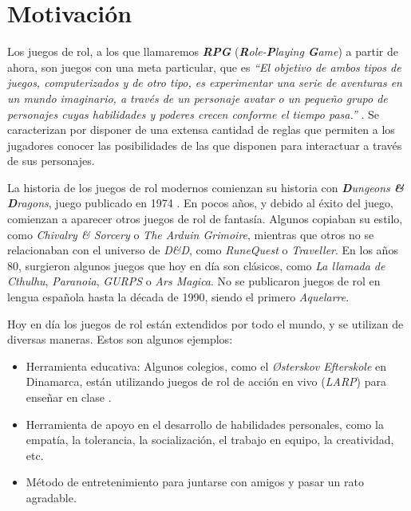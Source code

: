 
\section{Motivación} \label{Motivacion}
Los juegos de rol, a los que llamaremos \textbf{\textit{RPG}} (\textit{\textbf{R}ole-\textbf{P}laying \textbf{G}ame}) a 
partir de ahora, son juegos con una meta particular, que es \textit{“El objetivo de ambos tipos de juegos, computerizados y 
de otro tipo, es experimentar una serie de aventuras en un mundo imaginario, a través de un personaje avatar o un pequeño grupo de 
personajes cuyas habilidades y poderes crecen conforme el tiempo pasa.”} \autocite*{Adams2010}. Se caracterizan por 
disponer de una extensa cantidad de reglas que permiten a los jugadores conocer las posibilidades de las que disponen para 
interactuar a través de sus personajes.
\medskip

La historia de los juegos de rol modernos comienzan su historia con \textit{\textbf{D}ungeons \textbf{\&} \textbf{D}ragons}, 
juego publicado en 1974 \autocite*{HistoriaRPG}. En pocos años, y debido al éxito del juego, comienzan a aparecer otros juegos de rol de fantasía. 
Algunos copiaban su estilo, como \textit{Chivalry \& Sorcery} o \textit{The Arduin Grimoire}, mientras que otros no se 
relacionaban con el universo de \textit{D\&D}, como \textit{RuneQuest} o \textit{Traveller}. En los años 80, surgieron 
algunos juegos que hoy en día son clásicos, como \textit{La llamada de Cthulhu}, \textit{Paranoia}, \textit{GURPS} o \textit{Ars Magica}.
No se publicaron juegos de rol en lengua española hasta la década de 1990, siendo el primero \textit{Aquelarre}.\medskip

Hoy en día los juegos de rol están extendidos por todo el mundo, y se utilizan de diversas maneras. Estos son algunos ejemplos:
\begin{itemize}
    \item Herramienta educativa: Algunos colegios, como el \textit{Østerskov Efterskole} en Dinamarca, están utilizando juegos de 
    rol de acción en vivo (\textit{LARP}) para enseñar en clase \autocite*{LARPSchool}.
    \item Herramienta de apoyo en el desarrollo de habilidades personales, como la empatía, la tolerancia, la socialización, el trabajo
    en equipo, la creatividad, etc.
    \item Método de entretenimiento para juntarse con amigos y pasar un rato agradable.
\end{itemize}


